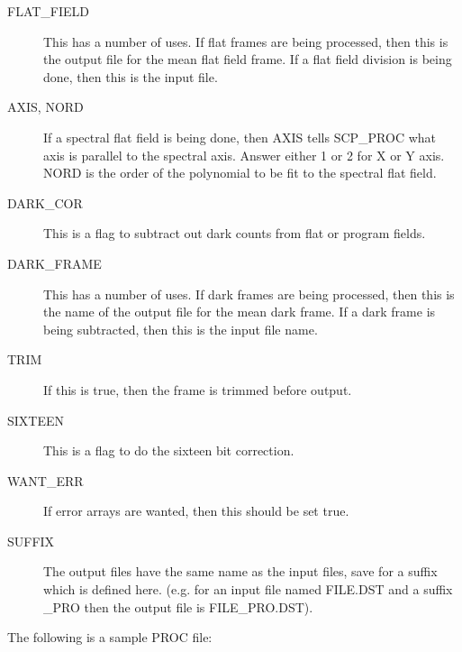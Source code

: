 \begin{description}
\item [FLAT\_FIELD] This has a number of uses. If flat frames are being
processed, then this is the output file for the mean flat field frame. If a
flat field division is being done, then this is the input file.

\item [AXIS, NORD] If a spectral flat field is being done, then  AXIS tells
SCP\_PROC what axis is parallel to the spectral axis. Answer either  1 or 2 for
X or Y axis. NORD is the order of the polynomial to be fit to the spectral flat
field.

\item [DARK\_COR] This is a flag to subtract out dark counts from flat or
program fields.

\item [DARK\_FRAME] This has a number of uses.  If dark frames are being
processed, then this is the name of the output file for the mean dark frame. If
a dark frame is being subtracted, then this is the input file name.

\item [TRIM] If this is true, then the frame is trimmed before output.

\item [SIXTEEN] This is a flag to do the sixteen bit correction.

\item [WANT\_ERR] If error arrays are wanted, then this should be set true.

\item [SUFFIX] The output files have the same name as the input files, save for
a suffix which is defined here. (e.g. for an input file named FILE.DST and a
suffix \_PRO then the output file is FILE\_PRO.DST).

\end{description}


\newpage

The following is a sample PROC file:

